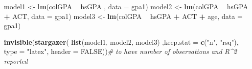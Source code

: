 \documentclass[]{book}
\newenvironment{Shaded}{\begin{snugshade}}{\end{snugshade}}
\newcommand{\CommentTok}[1]{\textcolor[rgb]{0.56,0.35,0.01}{\textit{#1}}}
\newcommand{\DataTypeTok}[1]{\textcolor[rgb]{0.13,0.29,0.53}{#1}}
\newcommand{\KeywordTok}[1]{\textcolor[rgb]{0.13,0.29,0.53}{\textbf{#1}}}
\newcommand{\NormalTok}[1]{#1}
\newcommand{\OperatorTok}[1]{\textcolor[rgb]{0.81,0.36,0.00}{\textbf{#1}}}
\newcommand{\OtherTok}[1]{\textcolor[rgb]{0.56,0.35,0.01}{#1}}
\newcommand{\StringTok}[1]{\textcolor[rgb]{0.31,0.60,0.02}{#1}}
\begin{document}
\begin{Shaded}
\begin{Highlighting}[]
\NormalTok{model1 <-}\StringTok{ }\KeywordTok{lm}\NormalTok{(colGPA }\OperatorTok{~}\StringTok{ }\NormalTok{hsGPA , }\DataTypeTok{data =}\NormalTok{ gpa1)}
\NormalTok{model2 <-}\StringTok{ }\KeywordTok{lm}\NormalTok{(colGPA }\OperatorTok{~}\StringTok{ }\NormalTok{hsGPA }\OperatorTok{+}\StringTok{ }\NormalTok{ACT, }\DataTypeTok{data =}\NormalTok{ gpa1)}
\NormalTok{model3 <-}\StringTok{ }\KeywordTok{lm}\NormalTok{(colGPA }\OperatorTok{~}\StringTok{ }\NormalTok{hsGPA }\OperatorTok{+}\StringTok{ }\NormalTok{ACT }\OperatorTok{+}\StringTok{ }\NormalTok{age, }\DataTypeTok{data =}\NormalTok{ gpa1)}
\end{Highlighting}
\end{Shaded}

\begin{Shaded}
\begin{Highlighting}[]
\KeywordTok{invisible}\NormalTok{(}\KeywordTok{stargazer}\NormalTok{(}
  \KeywordTok{list}\NormalTok{(model1, }
\NormalTok{       model2,}
\NormalTok{       model3)}
\NormalTok{  ,}\DataTypeTok{keep.stat =} \KeywordTok{c}\NormalTok{(}\StringTok{"n"}\NormalTok{, }\StringTok{"rsq"}\NormalTok{), }\DataTypeTok{type =} \StringTok{"latex"}\NormalTok{, }\DataTypeTok{header =} \OtherTok{FALSE}\NormalTok{))}\CommentTok{# to have number of observations and R^2 reported}
\end{Highlighting}
\end{Shaded}
\end{document}
